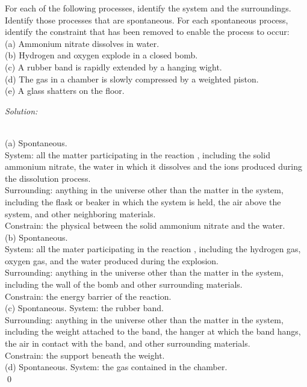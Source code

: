 \documentclass[12pt]{article}
\newenvironment{problem}[2][Problem]{\begin{trivlist}
\item[\hskip \labelsep {\bfseries #1}\hskip \labelsep {\bfseries #2.}]}{\end{trivlist}}
\newenvironment{sol}
    {\emph{Solution:}
    }
    {
    \qed
    }
\begin{document}
\begin{problem}{13.1}
For each of the following processes, identify the system and the surroundings. Identify those processes that are spontaneous. For each spontaneous process, identify the constraint that has been removed to enable the process to occur:\\
(a) Ammonium nitrate dissolves in water.\\
(b) Hydrogen and oxygen explode in a closed bomb.\\
(c) A rubber band is rapidly extended by a hanging wight.\\
(d) The gas in a chamber is slowly compressed by a weighted piston.\\
(e) A glass shatters on the floor.
\end{problem}
\begin{sol}
\\(a) Spontaneous.\\
System: all the matter participating in the reaction , including the solid ammonium nitrate, the water in which it dissolves and the ions produced during the dissolution process.\\
Surrounding: anything in the universe other than the matter in the system, including the flask or beaker in which the system is held, the air above the system, and other neighboring materials.\\
Constrain: the physical between the solid ammonium nitrate and the water.\\
(b) Spontaneous.\\
System: all the mater participating in the reaction , including the hydrogen gas, oxygen gas, and the water produced during the explosion.\\
Surrounding: anything in the universe other than the matter in the system, including the wall of the bomb and other surrounding materials.\\
Constrain: the energy barrier of the reaction.\\
(c) Spontaneous.
System: the rubber band.\\
Surrounding: anything in the universe other than the matter in the system, including the weight attached to the band, the hanger at which the band hangs, the air in contact with the band, and other surrounding materials.\\
Constrain: the support beneath the weight.\\
(d) Spontaneous.
System: the gas contained in the chamber.\\

\end{sol}
\end{document}
